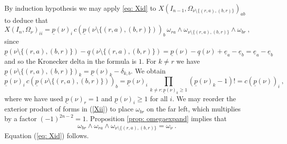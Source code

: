 \documentclass[10pt]{amsart}
\newcommand{\pp}{{\underline{p}}}
\newcommand{\qq}{{\underline{q}}}
\newcommand{\eee}{{\underline{e}}}
\theoremstyle{plain}
\newcommand{\0}{\color{blue}{\mathsf{0}}}
\begin{document}
By induction hypothesis we may apply \eqref{eq: Xid} to $X(I_{n-1},\Omega_{\nu\setminus\{(r,a),(b,r)\}})_{ab} $ to  deduce that 
\begin{equation}\label{Xii}
X(I_n,\Omega_\nu)_{ii}=\pp(\nu)_i\,
c(\pp(\nu\setminus\{(r,a),(b,r)\}))_b\,\omega_{ra}\wedge\omega_{\nu\setminus\{(r,a),(b,r)\}}\wedge\omega_{br}\ ,
\end{equation}
since $\pp(\nu\setminus\{(r,a),(b,r)\})  -  \qq(\nu\setminus\{(r,a),(b,r)\}) = \pp(\nu) -\qq(\nu) +\eee_a-\eee_b=\eee_a-\eee_b$ and so the Kronecker delta in the formula  is $1$. 
For $k\neq r$ we have $\pp(\nu\setminus\{(r,a),(b,r)\})_k=\pp(\nu)_k-\delta_{k,b}$. We obtain
$$
\pp(\nu)_i\,c(\pp(\nu\setminus\{(r,a),(b,r)\}))_b=\pp(\nu)_i\,\prod_{k\neq r:\pp(\nu)_k\geq1}(\pp(\nu)_k-1)!=c(\pp(\nu))_i\ ,
$$
where we have used $\pp(\nu)_r=1$ and $\pp(\nu)_i\geq1$ for all $i.$
We may  reorder  the exterior product of forms in   (\ref{Xii}) to place  $\omega_{br}$ on  the  far left, which multiplies by a factor $(-1)^{2n-2}=1.$
 Proposition \ref{prop: omegaexpand} implies that 
$$
\omega_{br}\wedge\omega_{ra}\wedge\omega_{\nu\setminus\{(r,a),(b,r)\}}=\omega_\nu\ .
$$
Equation (\ref{eq: Xid}) follows.
\end{document}
